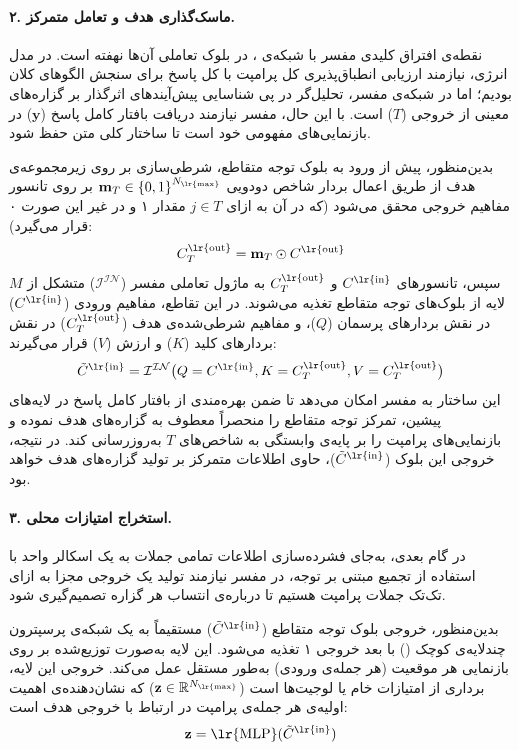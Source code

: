 \paragraph{۲. ماسک‌گذاری هدف و تعامل متمرکز.}
نقطه‌ی افتراق کلیدی مفسر با شبکه‌ی ، در بلوک تعاملی آن‌ها نهفته است. در مدل انرژی، نیازمند ارزیابی انطباق‌پذیری کل پرامپت با کل پاسخ برای سنجش الگوهای کلان بودیم؛ اما در شبکه‌ی مفسر، تحلیل‌گر در پی شناسایی پیش‌آیندهای اثرگذار بر گزاره‌های معینی از خروجی ($T$) است. با این حال، مفسر نیازمند دریافت بافتار کامل پاسخ ($\mathbf{y}$) در بازنمایی‌های مفهومی خود است تا ساختار کلی متن حفظ شود.

بدین‌منظور، پیش از ورود به بلوک توجه متقاطع، شرطی‌سازی بر روی زیرمجموعه‌ی هدف از طریق اعمال بردار شاخص دودویی $\mathbf{m}_T \in {\{0, 1\}}^{N_{\text{\lr{max}}}}$ بر روی تانسور مفاهیم خروجی محقق می‌شود (که در آن به ازای $j \in T$ مقدار ۱ و در غیر این صورت ۰ قرار می‌گیرد):
\begin{equation}
    C^{\text{\lr{out}}}_T = \mathbf{m}_T \odot C^{\text{\lr{out}}} \label{eq:chap4_target_masking}
\end{equation}
سپس، تانسورهای $C^{\text{\lr{in}}}$ و $C^{\text{\lr{out}}}_T$ به ماژول تعاملی مفسر ($\mathcal{I}^{\mathcal{IN}}$) متشکل از $M$ لایه از بلوک‌های توجه متقاطع تغذیه می‌شوند. در این تقاطع، مفاهیم ورودی ($C^{\text{\lr{in}}}$) در نقش بردارهای پرسمان ($Q$)، و مفاهیم شرطی‌شده‌ی هدف ($C^{\text{\lr{out}}}_T$) در نقش بردارهای کلید ($K$) و ارزش ($V$) قرار می‌گیرند:
\begin{equation}\label{eq:chap4_interp_interaction}
    \tilde{C}^{\text{\lr{in}}} = \mathcal{I}^{\mathcal{IN}}\big(Q=C^{\text{\lr{in}}}, K=C^{\text{\lr{out}}}_T, V=C^{\text{\lr{out}}}_T\big)
\end{equation}
این ساختار به مفسر امکان می‌دهد تا ضمن بهره‌مندی از بافتار کامل پاسخ در لایه‌های پیشین، تمرکز توجه متقاطع را منحصراً معطوف به گزاره‌های هدف نموده و بازنمایی‌های پرامپت را بر پایه‌ی وابستگی به شاخص‌های $T$ به‌روزرسانی کند. در نتیجه، خروجی این بلوک ($\tilde{C}^{\text{\lr{in}}}$)، حاوی اطلاعات متمرکز بر تولید گزاره‌های هدف خواهد بود.

\paragraph{۳. استخراج امتیازات محلی.}
در گام بعدی، به‌جای فشرده‌سازی اطلاعات تمامی جملات به یک اسکالر واحد با استفاده از تجمیع مبتنی بر توجه، در مفسر نیازمند تولید یک خروجی مجزا به ازای تک‌تک جملات پرامپت هستیم تا درباره‌ی انتساب هر گزاره تصمیم‌گیری شود.

بدین‌منظور، خروجی بلوک توجه متقاطع ($\tilde{C}^{\text{\lr{in}}}$) مستقیماً به یک شبکه‌ی پرسپترون چندلایه‌ی کوچک () با بعد خروجی ۱ تغذیه می‌شود. این لایه به‌صورت توزیع‌شده بر روی بازنمایی هر موقعیت (هر جمله‌ی ورودی) به‌طور مستقل عمل می‌کند. خروجی این لایه، برداری از امتیازات خام یا لوجیت‌ها است ($\mathbf{z} \in \mathbb{R}^{N_{\text{\lr{max}}}}$) که نشان‌دهنده‌ی اهمیت اولیه‌ی هر جمله‌ی پرامپت در ارتباط با خروجی هدف است:
\begin{equation}\label{eq:chap4_interp_logits}
    \mathbf{z} = \text{\lr{MLP}}(\tilde{C}^{\text{\lr{in}}})
\end{equation}

